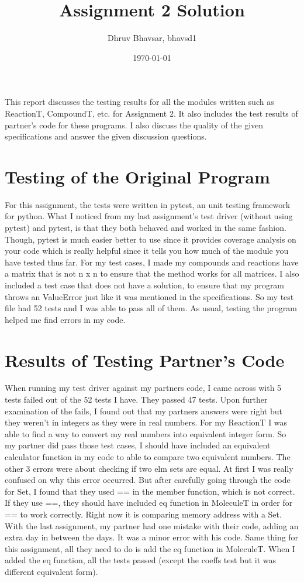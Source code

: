 \documentclass[12pt]{article}
\title{Assignment 2 Solution}
\author{Dhruv Bhavsar, bhavsd1}
\date{\today}
\begin{document}
\maketitle

This report discusses the testing results for all the modules written such as ReactionT, CompoundT, etc. for Assignment 2. It also includes the test results of partner's code for these programs. I also discuss the quality of the given specifications and answer the given discussion questions.

\section{Testing of the Original Program}
 For this assignment, the tests were written in pytest, an unit testing framework for python. What I noticed from my last assignment's test driver (without using pytest) and pytest, is that they both behaved and worked in the same fashion. Though, pytest is much easier better to use since it provides coverage analysis on your code which is really helpful since it tells you how much of the module you have tested thus far. For my test cases, I made my compounds and reactions have a matrix that is not n x n to ensure that the method works for all matrices. I also included a test case that does not have a solution, to ensure that my program throws an ValueError just like it was mentioned in the specifications. So my test file had 52 tests and I was able to pass all of them. As usual, testing the program helped me find errors in my code. 

\section{Results of Testing Partner's Code}
When running my test driver against my partners code, I came across with 5 tests failed out of the 52 tests I have. They passed 47 tests. Upon further examination of the fails, I found out that my partners answers were right but they weren't in integers as they were in real numbers. For my ReactionT I was able to find a way to convert my real numbers into equivalent integer form. So my partner did pass those test cases, I should have included an equivalent calculator function in my code to able to compare two equivalent numbers. The other 3 errors were about checking if two elm sets are equal. At first I was really confused on why this error occurred.  But after carefully going through the code for Set, I found that they used == in the member function, which is not correct. If they use ==, they should have included eq function in MoleculeT in order for == to work correctly. Right now it is comparing memory address with a Set. With the last assignment, my partner had one mistake with their code, adding an extra day in between the days. It was a minor error with his code. Same thing for this assignment, all they need to do is add the eq function in MoleculeT. When I added the eq function, all the tests passed (except the coeffs test but it was different equivalent form).
\end{document}
